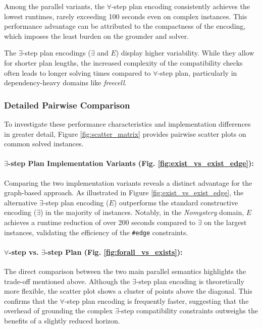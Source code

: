 \documentclass[
     11pt,                    %
     a4paper,             %
     BCOR=10mm,     %
     DIV=14,                 %
     listof=totoc,                    %
     bibliography=totoc,       %
     index=totoc,              %
     parskip            %
     twoside,
     headsepline
     ]{scrreprt}
\theoremstyle{definition}
\theoremstyle{definition}
\theoremstyle{remark}
\theoremstyle{bfnote}
\begin{document}
Among the parallel variants, the $\forall$-step plan encoding consistently achieves the lowest runtimes, rarely exceeding 100 seconds even on complex instances. 
This performance advantage can be attributed to the compactness of the encoding, which imposes the least burden on the grounder and solver.

The $\exists$-step plan encodings ($\exists$ and $E$) display higher variability. While they allow for shorter plan lengths, the increased complexity of the compatibility checks often leads to longer solving times compared to $\forall$-step plan, particularly in dependency-heavy domains like \textit{freecell}. 

\subsubsection{Detailed Pairwise Comparison}
To investigate these performance characteristics and implementation differences in greater detail, Figure \ref{fig:scatter_matrix} provides pairwise scatter plots on common solved instances.

\paragraph{$\exists$-step Plan Implementation Variants (Fig. \ref{fig:exist_vs_exist_edge}):}
Comparing the two implementation variants reveals a distinct advantage for the graph-based approach. 
As illustrated in Figure \ref{fig:exist_vs_exist_edge}, the alternative $\exists$-step plan encoding ($E$) outperforms the standard constructive encoding ($\exists$) in the majority of instances. 
Notably, in the \textit{Nomystery} domain, $E$ achieves a runtime reduction of over 200 seconds compared to $\exists$ on the largest instances, validating the efficiency of the \texttt{\#edge} constraints.

\paragraph{$\forall$-step vs. $\exists$-step Plan (Fig. \ref{fig:forall_vs_exists}):}
The direct comparison between the two main parallel semantics highlights the trade-off mentioned above. 
Although the $\exists$-step plan encoding is theoretically more flexible, the scatter plot shows a cluster of points above the diagonal. 
This confirms that the $\forall$-step plan encoding is frequently faster, suggesting that the overhead of grounding the complex $\exists$-step compatibility constraints outweighs the benefits of a slightly reduced horizon.
\end{document}

